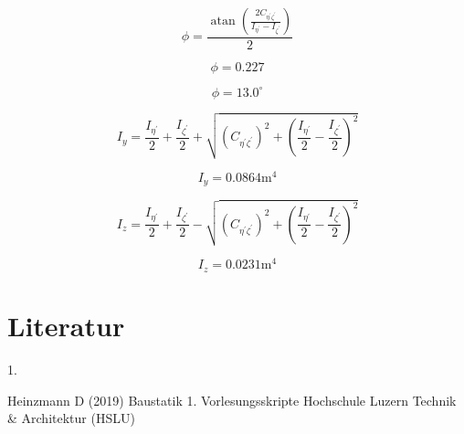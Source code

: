 \documentclass[
  12pt,
  letterpaper,
  DIV=11,
  egregdoesnotlikesansseriftitles]{scrartcl}
\newlength{\cslhangindent}
\newlength{\csllabelwidth}
\newlength{\cslentryspacingunit} %
\newenvironment{CSLReferences}[2] %
 {%
  \setlength{\parindent}{0pt}
  \ifodd #1
  \let\oldpar\par
  \def\par{\hangindent=\cslhangindent\oldpar}
  \fi
  \setlength{\parskip}{#2\cslentryspacingunit}
 }%
 {}
\newcommand{\CSLLeftMargin}[1]{\parbox[t]{\csllabelwidth}{#1}}
\newcommand{\CSLRightInline}[1]{\parbox[t]{\linewidth - \csllabelwidth}{#1}\break}
\begin{document}
\begin{equation}\phi = \frac{\operatorname{atan}{\left(\frac{2 C_{\eta^{'}\zeta^{'}}}{I_{\eta^{'}} - I_{\zeta^{'}}} \right)}}{2}\end{equation}

\begin{equation}\phi = 0.227\end{equation}

\begin{equation}\phi = 13.0 ^\circ\end{equation}

\begin{equation}I_{y} = \frac{I_{\eta^{'}}}{2} + \frac{I_{\zeta^{'}}}{2} + \sqrt{\left(C_{\eta^{'}\zeta^{'}}\right)^{2} + \left(\frac{I_{\eta^{'}}}{2} - \frac{I_{\zeta^{'}}}{2}\right)^{2}}\end{equation}

\begin{equation}I_{y} = 0.0864 \text{m}^{4}\end{equation}

\begin{equation}I_{z} = \frac{I_{\eta^{'}}}{2} + \frac{I_{\zeta^{'}}}{2} - \sqrt{\left(C_{\eta^{'}\zeta^{'}}\right)^{2} + \left(\frac{I_{\eta^{'}}}{2} - \frac{I_{\zeta^{'}}}{2}\right)^{2}}\end{equation}

\begin{equation}I_{z} = 0.0231 \text{m}^{4}\end{equation}

\newpage{}

\hypertarget{literatur}{%
\section*{Literatur}\label{literatur}}

\hypertarget{refs}{}
\begin{CSLReferences}{0}{0}
\leavevmode{}%
\CSLLeftMargin{1. }%
\CSLRightInline{Heinzmann D (2019) Baustatik 1. Vorlesungsskripte
Hochschule Luzern Technik \& Architektur (HSLU)}

\end{CSLReferences}
\end{document}
